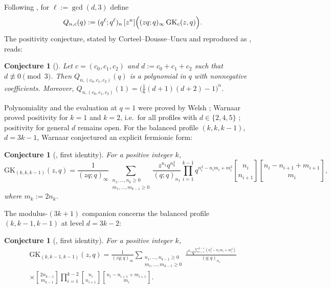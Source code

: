 \documentclass[11pt]{article}
\newtheorem{conjecture}[theorem]{Conjecture}
\newcommand{\qbin}[2]{\genfrac{[}{]}{0pt}{}{#1}{#2}}
\newcommand{\poch}[1]{(q;q)_{#1}}
\newcommand{\GK}{\mathrm{GK}}
\begin{document}
Following \cite{W23}, for $\ell:=\gcd(d,3)$ define
\begin{equation}\label{eq:Qdef}
Q_{n,c}(q):=(q^{\ell};q^{\ell})_n\,[z^n]\Bigl((zq;q)_\infty\,
\GK_c(z,q)\Bigr).
\end{equation}
The positivity conjecture, stated by Corteel--Dousse--Uncu
\cite[Conjecture~4.2]{CDU22} and reproduced as
\cite[Conjecture~2.7]{W23}, reads:

\begin{conjecture}[{\cite[Conjecture~2.7]{W23}}]\label{con:pos}
Let $c=(c_0,c_1,c_2)$ and $d:=c_0+c_1+c_2$ such that
$d\not\equiv 0\pmod 3$. Then $Q_{n,(c_0,c_1,c_2)}(q)$ is a polynomial in
$q$ with nonnegative coefficients. Moreover,
$Q_{n,(c_0,c_1,c_2)}(1)=\bigl(\tfrac16(d+1)(d+2)-1\bigr)^n$.
\end{conjecture}

Polynomiality and the evaluation at $q=1$ were proved by Welsh
\cite{Welsh21}; Warnaar proved positivity for $k=1$ and $k=2$, i.e.\ for
all profiles with $d\in\{2,4,5\}$ \cite{W23}; positivity for general $d$
remains open. For the balanced profile $(k,k,k-1)$, $d=3k-1$, Warnaar
conjectured an explicit fermionic form:

\begin{conjecture}[{\cite[Conjecture~2.5]{W23}, first identity}]
\label{con:ferm}
For a positive integer $k$,
\[
\GK_{(k,k,k-1)}(z,q)
=\frac{1}{(zq;q)_\infty}
\sum_{\substack{n_1,\dots,n_k\ge 0\\ m_1,\dots,m_{k-1}\ge 0}}
\frac{z^{n_1}q^{n_k^2}}{\poch{n_1}}
\prod_{i=1}^{k-1}q^{n_i^2-n_im_i+m_i^2}
\qbin{n_i}{n_{i+1}}\qbin{n_i-n_{i+1}+m_{i+1}}{m_i},
\]
where $m_k:=2n_k$.
\end{conjecture}

The modulus-$(3k+1)$ companion concerns the balanced profile
$(k,k-1,k-1)$ at level $d=3k-2$:

\begin{conjecture}[{\cite[Conjecture~2.11]{W23}, first identity}]
\label{con:fermb}
For a positive integer $k$,
\begin{multline*}
\GK_{(k,k-1,k-1)}(z,q)
=\frac{1}{(zq;q)_\infty}
\sum_{\substack{n_1,\dots,n_{k-1}\ge 0\\ m_1,\dots,m_{k-1}\ge 0}}
\frac{z^{n_1}q^{\sum_{i=1}^{k-1}(n_i^2-n_im_i+m_i^2)}}{\poch{n_1}}\\
\times\qbin{2n_{k-1}}{m_{k-1}}
\prod_{i=1}^{k-2}\qbin{n_i}{n_{i+1}}\qbin{n_i-n_{i+1}+m_{i+1}}{m_i}.
\end{multline*}
\end{conjecture}
\end{document}
